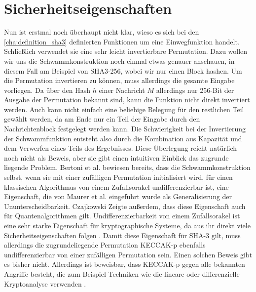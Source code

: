 \section{Sicherheitseigenschaften}
\label{cha:sha3_sicherheit}
Nun ist erstmal noch überhaupt nicht klar, wieso es sich bei den \ref{cha:definition_sha3} definierten Funktionen um eine Einwegfunktion handelt.
Schließlich verwendet sie eine sehr leicht invertierbare Permutation. Dazu wollen wir uns die Schwammkonstruktion noch einmal etwas genauer anschauen,
in diesem Fall am Beispiel von SHA3-256, wobei wir nur einen Block hashen. Um die Permutation invertieren zu können,
muss allerdings die gesamte Eingabe vorliegen. Da über den Hash $h$ einer Nachricht $M$ allerdings nur 256-Bit der Ausgabe der Permutation bekannt sind,
kann die Funktion nicht direkt invertiert werden. Auch kann nicht einfach eine beliebige Belegung für den restlichen Teil gewählt werden,
da am Ende nur ein Teil der Eingabe durch den Nachrichtenblock festgelegt werden kann. 
Die Schwierigkeit bei der Invertierung der Schwammfunktion entsteht also durch die Kombination aus Kapazität und dem Verwerfen eines Teils des Ergebnisses.
Diese Überlegung reicht natürlich noch nicht als Beweis, aber sie gibt einen intuitiven Einblick das zugrunde liegende Problem.
Bertoni et al. \cite{indifferentiability} bewiesen bereits, dass die Schwammkonstruktion selbst, wenn sie mit einer zufälligen Permutation initialisiert wird,
für einen klassischen Algorithmus von einem Zufallsorakel undifferenzierbar ist, eine Eigenschaft, die von Maurer et al. \cite{MaReHo04} eingeführt wurde als Generalisierung
der Ununterscheidbarkeit. Czajkowski \cite{quantum_indifferentiability} Zeigte außerdem, dass diese Eigenschaft auch für Quantenalgorithmen gilt. Undifferenzierbarkeit von einem Zufallsorakel
ist eine sehr starke Eigenschaft für kryptographische Systeme, da aus ihr direkt viele Sicherheitseigenschaften folgen \cite{indifferentiability}.
Damit diese Eigenschaft für SHA-3 gilt, muss allerdings die zugrundeliegende Permutation KECCAK-p ebenfalls undifferenzierbar von einer zufälligen Permutation sein.
Einen solchen Beweis gibt es bisher nicht. Allerdings ist beweisbar, dass KECCAK-p gegen alle bekannten Angriffe besteht, die zum Beispiel Techniken
wie die lineare oder differenzielle Kryptoanalyse verwenden \cite{Keccak11}.